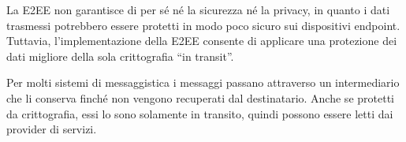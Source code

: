 \begin{frame}
    La E2EE non garantisce di per sé né la sicurezza né la privacy, in quanto i dati trasmessi potrebbero essere protetti in modo poco sicuro sui dispositivi endpoint.\newline
    Tuttavia, l'implementazione della E2EE consente di applicare una protezione dei dati migliore della sola crittografia ``in transit''.\newline\pause

    Per molti sistemi di messaggistica i messaggi passano attraverso un intermediario che li conserva finché non vengono recuperati dal destinatario. Anche se protetti da crittografia, essi lo sono solamente in transito, quindi possono essere letti dai provider di servizi.\newline

    \cite{intransitEncryption}

\end{frame}

%
%
%

